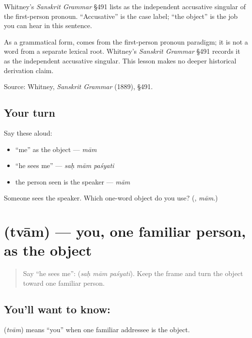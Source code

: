 Whitney's \emph{Sanskrit Grammar} §491 lists \textbf{} as the independent accusative singular of the first-person pronoun. “Accusative” is the case label; “the object” is the job you can hear in this sentence.

\begin{cousinweb}
As a grammatical form, \textbf{} comes from the first-person pronoun paradigm; it is not a word from a separate lexical root. Whitney's \emph{Sanskrit Grammar} §491 records it as the independent accusative singular. This lesson makes no deeper historical derivation claim.

Source: Whitney, \emph{Sanskrit Grammar} (1889), §491.
\end{cousinweb}

\subsection*{Your turn}
Say these aloud:

\begin{itemize}
\raggedright
  \item “me” as the object — \emph{mām}
  \item “he sees me” — \emph{saḥ mām paśyati}
  \item the person seen is the speaker — \emph{mām}
\end{itemize}

\begin{tcolorbox}[breakable,colback=teal!4,colframe=teal!35!black,title={Before you move on}]
Someone sees the speaker. Which one-word object do you use? (\textbf{}, \emph{mām}.)
\end{tcolorbox}
\section[\texorpdfstring{\sk{त्वाम्} (tvām)}{त्वाम् (tvām)}]{ (tvām) — you, one familiar person, as the object}

\label{lesson:SA-C260-tvam}



\begin{quote}
Say “he sees me”: \textbf{  } (\emph{saḥ mām paśyati}). Keep the frame and turn the object toward one familiar person.
\end{quote}

\subsection*{You'll want to know: }
\textbf{} (\emph{tvām}) means “you” when one familiar addressee is the object.

